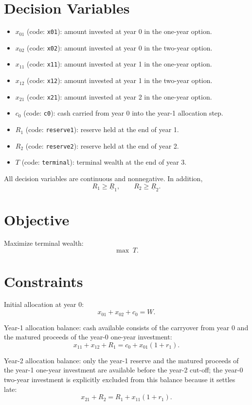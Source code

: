\section*{Decision Variables}

\begin{itemize}
    \item $x_{01}$ (code: \texttt{x01}): amount invested at year 0 in the one-year option.
    \item $x_{02}$ (code: \texttt{x02}): amount invested at year 0 in the two-year option.
    \item $x_{11}$ (code: \texttt{x11}): amount invested at year 1 in the one-year option.
    \item $x_{12}$ (code: \texttt{x12}): amount invested at year 1 in the two-year option.
    \item $x_{21}$ (code: \texttt{x21}): amount invested at year 2 in the one-year option.
    \item $c_0$ (code: \texttt{c0}): cash carried from year 0 into the year-1 allocation step.
    \item $R_1$ (code: \texttt{reserve1}): reserve held at the end of year 1.
    \item $R_2$ (code: \texttt{reserve2}): reserve held at the end of year 2.
    \item $T$ (code: \texttt{terminal}): terminal wealth at the end of year 3.
\end{itemize}

All decision variables are continuous and nonnegative. In addition,
\[
R_1 \ge \underline{R}_1, \qquad R_2 \ge \underline{R}_2.
\]

\section*{Objective}

Maximize terminal wealth:
\[
\max \; T.
\]

\section*{Constraints}

Initial allocation at year 0:
\[
x_{01} + x_{02} + c_0 = W.
\]

Year-1 allocation balance: cash available consists of the carryover from year 0 and the matured proceeds of the year-0 one-year investment:
\[
x_{11} + x_{12} + R_1 = c_0 + x_{01}(1+r_1).
\]

Year-2 allocation balance: only the year-1 reserve and the matured proceeds of the year-1 one-year investment are available before the year-2 cut-off; the year-0 two-year investment is explicitly excluded from this balance because it settles late:
\[
x_{21} + R_2 = R_1 + x_{11}(1+r_1).
\]

